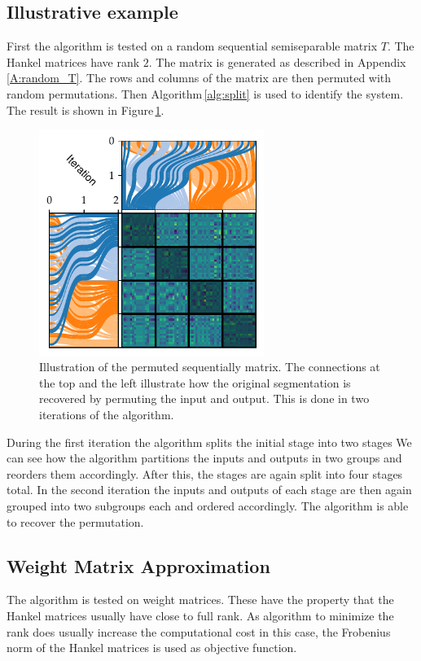 \documentclass[doctype=mastersthesis,BCOR=15mm,biblatex]{ldvbook}%
\begin{document}
\subsection{Illustrative example}
First the algorithm is tested on a random sequential semiseparable matrix $T$.
The Hankel matrices have rank $2$.
The matrix is generated as described in Appendix\,\ref{A:random_T}. 
The rows and columns of the matrix are then permuted with random permutations.
Then Algorithm\,\ref{alg:split} is used to identify the system.
The result is shown in Figure\,\ref{fig:example_permute}.
\begin{figure}[!htb]
	\centering
	\includegraphics[width=0.65\textwidth]{Plots/example_permute.pdf}
	\caption{Illustration of the permuted sequentially matrix.
		The connections at the top and the left illustrate how the original segmentation is recovered by permuting the input and output.
		This is done in two iterations of the algorithm.
	}
	\label{fig:example_permute}
\end{figure}
During the first iteration the algorithm splits the initial stage into two stages
We can see how the algorithm partitions the inputs and outputs in two groups and reorders them accordingly.
After this, the stages are again split into four stages total.
In the second iteration the inputs and outputs of each stage are then again grouped into two subgroups each and ordered accordingly.
The algorithm is able to recover the permutation.

\subsection{Weight Matrix Approximation}
The algorithm is tested on weight matrices.
These have the property that the Hankel matrices usually have close to full rank. 
As algorithm to minimize the rank does usually increase the computational cost in this case, the Frobenius norm of the Hankel matrices is used as objective function.
\end{document}
